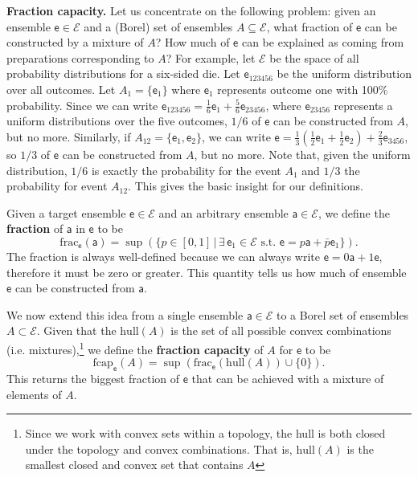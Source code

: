 \documentclass[10pt,twocolumn, nofootinbib]{revtex4-2}
\newcommand\hull{\mathrm{hull}}
\newcommand\fraction{\mathrm{frac}}
\newcommand\frcap{\mathrm{fcap}}
\newcommand{\ens}[1][e] {\mathsf{#1}} %
\newcommand{\Ens}[1][E] {\mathcal{#1}} %
\begin{document}
\textbf{Fraction capacity.} Let us concentrate on the following problem: given an ensemble $\ens \in \Ens$ and a (Borel) set of ensembles $A \subseteq \Ens$, what fraction of $\ens$ can be constructed by a mixture of $A$? How much of $\ens$ can be explained as coming from preparations corresponding to $A$? For example, let $\Ens$ be the space of all probability distributions for a six-sided die. Let $\ens_{123456}$ be the uniform distribution over all outcomes. Let $A_1 = \{\ens_1\}$ where $\ens_1$ represents outcome one with 100\% probability. Since we can write $\ens_{123456} = \frac{1}{6} \ens_{1} + \frac{5}{6} \ens_{23456}$, where $\ens_{23456}$ represents a uniform distributions over the five outcomes, $1/6$ of $\ens$ can be constructed from $A$, but no more. Similarly, if $A_{12} = \{\ens_{1},\ens_{2}\}$, we can write $\ens = \frac{1}{3} \left(\frac{1}{2} \ens_1 + \frac{1}{2} \ens_2 \right)  + \frac{2}{3} \ens_{3456}$, so $1/3$ of $\ens$ can be constructed from $A$, but no more. Note that, given the uniform distribution, $1/6$ is exactly the probability for the event $A_1$ and $1/3$ the probability for event $A_{12}$. This gives the basic insight for our definitions.

Given a target ensemble $\ens \in \Ens$ and an arbitrary ensemble $\ens[a] \in \Ens$, we define the \textbf{fraction} of $\ens[a]$ in $\ens$ to be
\begin{equation}
	\fraction_{\ens}(\ens[a]) = \sup(\{ p \in [0,1] \, | \, \exists \, \ens_1 \in \Ens \text{ s.t. }  \ens = p \ens[a] + \bar{p} \ens_1 \}).
\end{equation}
The fraction is always well-defined because we can always write $\ens = 0 \ens[a] + 1 \ens$, therefore it must be zero or greater. This quantity tells us how much of ensemble $\ens$ can be constructed from $\ens[a]$. 

We now extend this idea from a single ensemble $\ens[a] \in \Ens$ to a Borel set of ensembles $A \subset \Ens$. Given that the $\hull(A)$ is the set of all possible convex combinations (i.e. mixtures),\footnote{Since we work with convex sets within a topology, the hull is both closed under the topology and convex combinations. That is, $\hull(A)$ is the smallest closed and convex set that contains $A$} we define the \textbf{fraction capacity} of $A$ for $\ens$ to be
\begin{equation}
	\frcap_{\ens}(A) = \sup(\fraction_{\ens}(\hull(A))\cup\{0\}).
\end{equation}
This returns the biggest fraction of $\ens$ that can be achieved with a mixture of elements of $A$.
\end{document}
